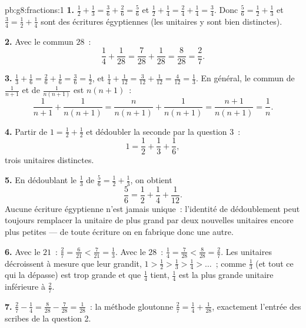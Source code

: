 \begin{solution}{pb:g8:fractions:1}
\textbf{1.} $\frac12 + \frac13 = \frac36 + \frac26 = \frac56$ et
$\frac12 + \frac14 = \frac24 + \frac14 = \frac34$. Donc
$\frac56 = \frac12 + \frac13$ et $\frac34 = \frac12 + \frac14$ sont
des écritures égyptiennes (les  unitaires y sont bien
distinctes).

\textbf{2.} Avec le  commun $28$~:
\[
\frac14 + \frac{1}{28} = \frac{7}{28} + \frac{1}{28}
= \frac{8}{28} = \frac{2}{7} .
\]

\textbf{3.} $\frac13 + \frac16 = \frac26 + \frac16 = \frac36 =
\frac12$, et $\frac14 + \frac{1}{12} = \frac{3}{12} +
\frac{1}{12} = \frac{4}{12} = \frac13$. En général, le 
commun de $\frac{1}{n+1}$ et de $\frac{1}{n(n+1)}$ est $n(n+1)$~:
\[
\frac{1}{n+1} + \frac{1}{n(n+1)}
= \frac{n}{n(n+1)} + \frac{1}{n(n+1)}
= \frac{n+1}{n(n+1)}
= \frac{1}{n} .
\]

\textbf{4.} Partir de $1 = \frac12 + \frac12$ et dédoubler la
seconde  par la question 3~:
\[
1 = \frac12 + \frac13 + \frac16 ,
\]
trois  unitaires distinctes.

\textbf{5.} En dédoublant le $\frac13$ de $\frac56 = \frac12 +
\frac13$, on obtient
\[
\frac56 = \frac12 + \frac14 + \frac{1}{12} .
\]
Aucune écriture égyptienne n'est jamais unique~: l'identité de
dédoublement peut toujours remplacer la  unitaire de plus
grand  par deux nouvelles  unitaires encore
plus petites --- de toute écriture on en fabrique donc une autre.

\textbf{6.} Avec le  $21$~: $\frac27 = \frac{6}{21} <
\frac{7}{21} = \frac13$. Avec le  $28$~: $\frac14 =
\frac{7}{28} < \frac{8}{28} = \frac27$. Les  unitaires
décroissent à mesure que leur  grandit,
$1 > \frac12 > \frac13 > \frac14 > \dots$~; comme $\frac13$ (et tout
ce qui la dépasse) est trop grande et que $\frac14$ tient, $\frac14$
est la plus grande  unitaire inférieure à $\frac27$.

\textbf{7.} $\frac27 - \frac14 = \frac{8}{28} - \frac{7}{28} =
\frac{1}{28}$~: la méthode gloutonne 
$\frac27 = \frac14 + \frac{1}{28}$, exactement l'entrée des scribes
de la question 2.


\end{solution}
